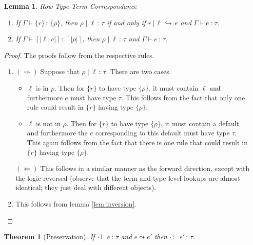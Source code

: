 \documentclass{article}
\newtheorem{theorem}{Theorem}
\newtheorem{lemma}{Lemma}
\newcommand{\variant}[1]{[\!|#1|\!]}
\newcommand{\hastp}[3]{#1 \vdash #2 \,:\, #3}
\newcommand{\haslbl}[3]{#1\;|\;#2\,:\, #3}
\newcommand{\haslbltm}[3]{#1\,|\,#2\,\hookrightarrow\, #3}
\newcommand{\step}[2]{#1 \leadsto #2}
\begin{document}
\begin{lemma}{Row Type-Term Correspondance} \label{lem:row-type-term}
  \mbox{}
  \begin{enumerate}
  \item If \(\hastp \Gamma {\{r\}} {\{\rho\}}\), then \(\haslbl \rho \ell \tau\)
    if and only if \(\haslbltm r \ell e\) and \(\hastp \Gamma e \tau\).
  \item If \(\hastp \Gamma {\variant {\ell : e}} {\variant \rho}\), then
    \(\haslbl \rho \ell \tau\) and \(\hastp \Gamma e \tau\).
  \end{enumerate}
\end{lemma}

\begin{proof}
  The proofs follow from the respective rules.
  \mbox{}
  \begin{enumerate}
  \item \((\Rightarrow)\) Suppose that \(\haslbl \rho \ell \tau\). There are two
    cases.
    \begin{itemize}
    \item \(\ell\) is in \(\rho\). Then for \(\{r\}\) to have type \(\{\rho\}\), it
      must contain \(\ell\) and furthermore \(e\) must have type \(\tau\). This
      follows from the fact that only one rule could result in \(\{r\}\) having
      type \(\{\rho\}\).
    \item \(\ell\) is not in \(\rho\). Then for \(\{r\}\) to have type
      \(\{\rho\}\), it must contain a default and furthermore the \(e\)
      corresponding to this default must have type \(\tau\). This again follows
      from the fact that there is one rule that could result in \(\{r\}\) having
      type \(\{\rho\}\).
    \end{itemize}

    \((\Leftarrow)\) This follows in a similar manner as the forward direction,
    except with the logic reversed (observe that the term and type level lookups
    are almost identical; they just deal with different objects).
  \item This follows from lemma \ref{lem:inversion}.
  \end{enumerate}
\end{proof}

\begin{theorem}[Preservation]
If $\hastp{\cdot}{e}{\tau}$ and $\step{e}{e'}$ then $\hastp{\cdot}{e'}{\tau}$.
\end{theorem}
\end{document}
